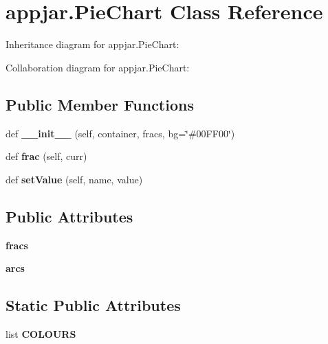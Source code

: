 \hypertarget{classappjar_1_1_pie_chart}{}\section{appjar.\+Pie\+Chart Class Reference}
\label{classappjar_1_1_pie_chart}


Inheritance diagram for appjar.\+Pie\+Chart\+:


Collaboration diagram for appjar.\+Pie\+Chart\+:
\subsection*{Public Member Functions}
\begin{DoxyCompactItemize}
\item 
\mbox{\label{classappjar_1_1_pie_chart_aec0393ea3ee83681ad1e12373d928edc}} 
def {\bfseries \+\_\+\+\_\+init\+\_\+\+\_\+} (self, container, fracs, bg=\char`\"{}\#00\+F\+F00\char`\"{})
\item 
\mbox{\label{classappjar_1_1_pie_chart_a648893655315590c1d4e8f42e1abd207}} 
def {\bfseries frac} (self, curr)
\item 
\mbox{\label{classappjar_1_1_pie_chart_a83591386ed7e2747ff2ffb16ddd175cd}} 
def {\bfseries set\+Value} (self, name, value)
\end{DoxyCompactItemize}
\subsection*{Public Attributes}
\begin{DoxyCompactItemize}
\item 
\mbox{\label{classappjar_1_1_pie_chart_a8f2a31b05eb41058c88db516290a9873}} 
{\bfseries fracs}
\item 
\mbox{\label{classappjar_1_1_pie_chart_a9b52bc8c046b2f35cf86525b4c90c0b8}} 
{\bfseries arcs}
\end{DoxyCompactItemize}
\subsection*{Static Public Attributes}
\begin{DoxyCompactItemize}
\item 
list {\bfseries C\+O\+L\+O\+U\+RS}
\end{DoxyCompactItemize}


